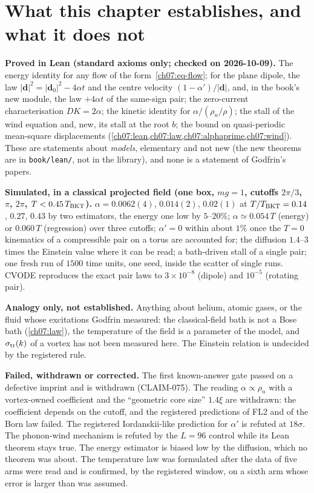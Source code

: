 \section{What this chapter establishes, and what it does not}\label{ch07:honest}

\begin{honestbox}
\textbf{Proved in Lean (standard axioms only; checked on 2026-10-09).} The energy identity for any flow of the form~\eqref{ch07:eq-flow}; for the plane dipole, the law $|\mathbf d|^2=|\mathbf d_0|^2-4\alpha t$ and the centre velocity $(1-\alpha')/|\mathbf d|$, and, in the book's new module, the law $+4\alpha t$ of the same-sign pair; the zero-current characterisation $DK=2\alpha$; the kinetic identity for $\alpha/(\rho_n/\rho)$; the stall of the wind equation and, new, its stall at the root $b$; the bound on quasi-periodic mean-square displacements (\cref{ch07:lean,ch07:law,ch07:alphaprime,ch07:wind}). These are statements about \emph{models}, elementary and not new (the new theorems are in \texttt{book/lean/}, not in the library), and none is a statement of Godfrin's papers.

\textbf{Simulated, in a classical projected field (one box, $mg=1$, cutoffs $2\pi/3$, $\pi$, $2\pi$, $T<0.45\,T_{\rm BKT}$).} $\alpha=0.0062(4)$, $0.014(2)$, $0.02(1)$ at $T/T_{\rm BKT}=0.14$, $0.27$, $0.43$ by two estimators, the energy one low by $5$--$20\%$; $\alpha\simeq0.054\,T$ (energy) or $0.060\,T$ (regression) over three cutoffs; $\alpha'=0$ within about $1\%$ once the $T=0$ kinematics of a compressible pair on a torus are
accounted for; the diffusion $1.4$--$3$ times the Einstein value where it can be read; a bath-driven stall of a single pair; one fresh run of $1500$ time units, one seed, inside the scatter of single runs. CVODE reproduces the exact pair laws to $3\times10^{-8}$ (dipole) and $10^{-5}$ (rotating pair).

\textbf{Analogy only, not established.} Anything about helium, atomic gases, or the fluid whose excitations Godfrin measured: the classical-field bath is not a Bose bath (\cref{ch07:law}), the temperature of the field is a parameter of the model, and $\sigma_{\rm tr}(k)$ of a vortex has not been measured here. The Einstein relation is undecided by the registered rule.

\textbf{Failed, withdrawn or corrected.} The first known-answer gate passed on a defective imprint and is withdrawn (CLAIM-075). The reading $\alpha\propto\rho_n$ with a vortex-owned coefficient and the ``geometric core size'' $1.4\xi$ are withdrawn: the coefficient depends on the cutoff, and the registered predictions of FL2 and of the Born law failed. The registered Iordanskii-like prediction for $\alpha'$ is refuted at $18\sigma$. The phonon-wind mechanism is
refuted by the $L=96$ control while its Lean theorem stays true. The energy estimator is biased low by the diffusion, which no theorem was about. The temperature law was formulated after the data of five arms were read and is confirmed, by the registered window, on a sixth arm whose error is larger than was assumed.
\end{honestbox}

